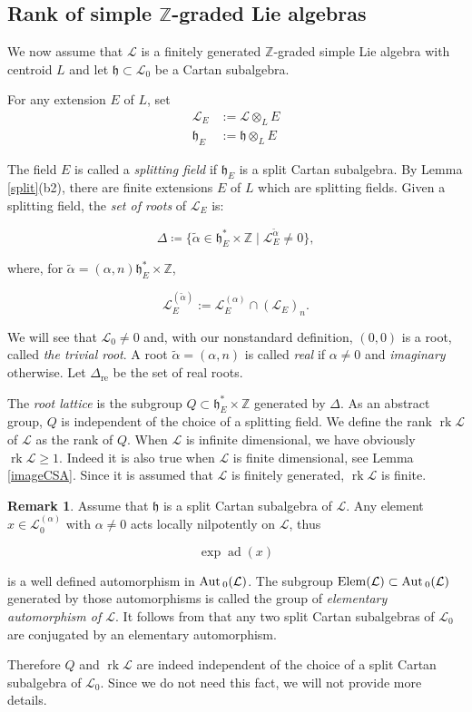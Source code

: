 \documentclass[11pt, letterpaper, reqno]{amsart}
\theoremstyle{definition}
\newtheorem{remark}[theorem]{Remark}
\newcommand{\ad}{\operatorname{ad}}
\newcommand{\rk}{\operatorname{rk}}
\newcommand{\Z}{{\mathbb Z}}
\newcommand{\cL}{\mathcal L}
\newcommand{\Aut}{\mbox{\rm Aut\,}}
\newcommand{\fh}{\mathfrak{h}}
\newcommand{\Elem}{\mathrm{Elem}}
\begin{document}
\subsection{Rank of simple $\Z$-graded Lie algebras}
We now assume that $\cL$ is a finitely generated $\Z$-graded simple Lie algebra with centroid $L$ and let $\fh\subset\cL_0$ be a Cartan subalgebra. 

For any extension $E$ of $L$, set
\begin{align*}
\cL_E&:=\cL\otimes_L E\\
\fh_E&:=\fh \otimes_L E
\end{align*}

The field $E$ is called a {\it splitting field} if
$\fh_E$ is a split Cartan subalgebra.
By Lemma \ref{split}(b2), there are finite extensions  $E$ of $L$
which are splitting fields. Given a splitting field,
the {\it set of roots}  of 
$\mathcal{L}_E$ is:

$$\Delta\coloneqq \{\widetilde{\alpha}\in \fh^*_E\times\Z\mid \cL_E^{\widetilde\alpha}\neq 0\},$$

\noindent where, for  $\widetilde\alpha=(\alpha,n)\fh^*_E\times\Z$,

$$\cL_E^{(\widetilde\alpha)}:=\cL_E^{(\alpha)}\cap (\cL_E)_n.$$

\noindent We will see that $\cL_0\neq 0$ and, with our nonstandard definition, $(0,0)$ is a root, called {\it the trivial root}.
A root $\widetilde{\alpha}=(\alpha,n)$ is called
{\it real} if $\alpha\neq 0$ and  {\it imaginary} otherwise. Let $\Delta_{\operatorname{re}}$ be the set of real roots.

The {\it root lattice} is the subgroup
$Q\subset \fh_E^*\times \Z$ generated by $\Delta$. 
As an abstract group, $Q$ is independent of the choice of a splitting field. We define the rank 
$\rk\cL$ of
$\cL$ as the rank of $Q$. When $\cL$ is infinite dimensional,
we have obviously $\rk\cL\geq 1$. Indeed  it is also true when $\cL$ is finite dimensional, see  Lemma \ref{imageCSA}.
Since  it is assumed that $\cL$ is finitely generated,
$\rk\cL$ is finite.



\smallskip
\begin{remark} Assume that
$\fh$ is a split Cartan subalgebra of
$\cL$. Any element $x\in\cL_0^{(\alpha)}$
with $\alpha\neq 0$ acts locally nilpotently on $\cL$, thus 

$$\exp\ad(x)$$ 

\noindent is a well defined automorphism in $\Aut_0(\cL)$.
The subgroup $\Elem(\cL)\subset\Aut_0(\cL)$ generated by those automorphisms is called the group of {\it elementary automorphism of $\cL$}. It follows from \cite{Bourbaki} that any two split Cartan subalgebras of ${\mathcal L}_0$ are conjugated by an elementary automorphism. 

Therefore $Q$ and  $\rk\cL$
are indeed independent of the choice of a split Cartan subalgebra of ${\mathcal L}_0$. Since we do not need
this fact, we will not provide more details.
\end{remark} 
\end{document}
